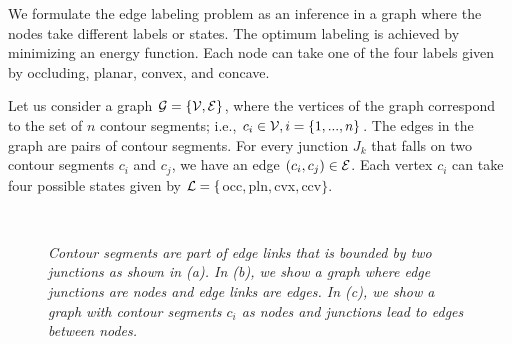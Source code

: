 We formulate the edge labeling problem as an inference in a graph where the nodes take 
different labels or states. The optimum labeling is achieved by minimizing an energy 
function. Each node can take one of the four labels given by occluding, planar, convex, 
and concave.

Let us consider a graph ${\cal G}=\{{\cal V},{\cal E}\}$, where the vertices of the graph 
correspond to the set of $n$ contour segments; i.e., $c_i \in {\cal V},i=\{1,...,n\}$. The 
edges in the graph are pairs of contour segments. For every junction $J_k$ that falls on 
two contour segments $c_i$ and $c_j$, we have an edge $(c_i,c_j) \in {\cal E}$. Each 
vertex $c_i$ can take four possible states given by ${\cal L}=\{$occ$,$pln$,$cvx$,$ccv$\}$.

\begin{figure}[t]
       \centering
        \hfill
        \hfill
        \\
       \caption{\it Contour segments are part of edge links that is bounded by two junctions as shown 
			in (a). In (b), we show a graph where edge junctions are nodes and edge links are edges. In 
			(c), we show a graph with contour segments $c_i$ as nodes and junctions lead to edges between nodes.}
\label{fig:graph_construction}
\end{figure}


